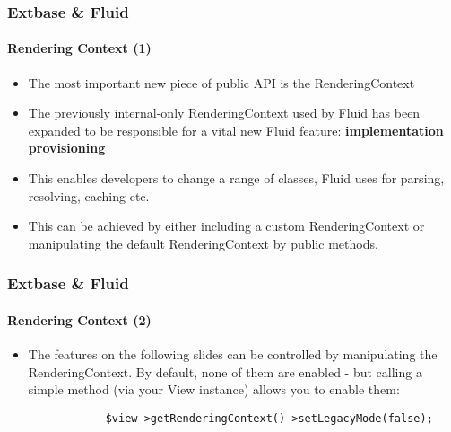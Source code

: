 \begin{frame}[fragile]
	\frametitle{Extbase \& Fluid}
	\framesubtitle{Rendering Context (1)}

	\lstset{basicstyle=\tiny\ttfamily}

	\begin{itemize}

		\item The most important new piece of public API is the RenderingContext

		\item The previously internal-only RenderingContext used by Fluid has been
			expanded to be responsible for a vital new Fluid feature:
			\textbf{implementation provisioning}

		\item This enables developers to change a range of classes, Fluid uses for
			parsing, resolving, caching etc.

		\item This can be achieved by either including a custom RenderingContext or
			manipulating the default RenderingContext by public methods.

	\end{itemize}

\end{frame}


\begin{frame}[fragile]
	\frametitle{Extbase \& Fluid}
	\framesubtitle{Rendering Context (2)}

	\lstset{basicstyle=\smaller\ttfamily}

	\begin{itemize}

		\item The features on the following slides can be controlled by manipulating
			the RenderingContext. By default, none of them are enabled - but calling
			a simple method (via your View instance) allows you to enable them:

		\begin{lstlisting}
			$view->getRenderingContext()->setLegacyMode(false);
		\end{lstlisting}

	\end{itemize}

\end{frame}

